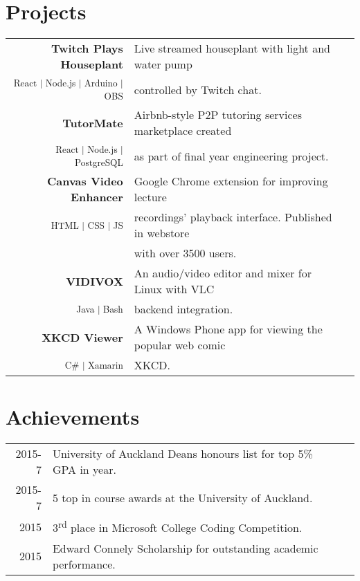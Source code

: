 \documentclass[letterpaper]{deedy-resume} %
\begin{document}
\begin{minipage}[t]{0.655\textwidth}
\sectionspace %

\vspace{-0.5em}
\section{Projects}
\bgroup
\setlength{\parindent}{-0.5em}
\begin{tabular}{rll}
\textbf{Twitch Plays Houseplant} & Live streamed houseplant with light and water pump\\
\vspace{5pt}
\textsuperscript{React | Node.js | Arduino | OBS} & controlled by Twitch chat.\\
\textbf{TutorMate} & Airbnb-style P2P tutoring services marketplace created\\
\vspace{5pt}
\textsuperscript{React | Node.js | PostgreSQL} & as part of final year engineering project.\\
\textbf{Canvas Video Enhancer} & Google Chrome extension for improving lecture\\
\textsuperscript{HTML | CSS | JS} & recordings' playback interface. Published in webstore\\
\vspace{5pt}
& with over 3500 users.\\
\textbf{VIDIVOX} & An audio/video editor and mixer for Linux with VLC\\ 
\vspace{5pt}
\textsuperscript{Java | Bash} & backend integration.\\
\textbf{XKCD Viewer} & A Windows Phone app for viewing the popular web comic\\
\vspace{5pt}
\textsuperscript{C\# | Xamarin} & XKCD.\\

\end{tabular}
\egroup

\sectionspace
\vspace{-0.5em}
\section{Achievements} 

\begin{tabular}{rll}
2015-7	 & University of Auckland Deans honours list for top 5\% GPA in year.\\
2015-7   & 5 top in course awards at the University of Auckland.\\
2015	 & 3\textsuperscript{rd} place in Microsoft College Coding Competition.\\
2015	 & Edward Connely Scholarship for outstanding academic performance.\\
\end{tabular}


\end{minipage}
\end{document}

